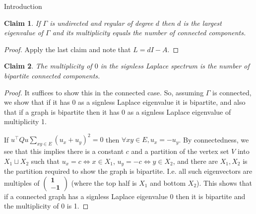 \documentclass{article}
\newtheorem{claim}{Claim}
\begin{document}
\begin{section}{Introduction}
    \begin{claim}
      If $\Gamma$ is undirected and regular of degree $d$ then $d$ is the largest eigenvalue of $\Gamma$ and its multiplicity equals the number of connected components.
    \end{claim}
    \begin{proof}
      Apply the last claim and note that $L = dI - A$.
    \end{proof}
    \begin{claim}
      The multiplicity of $0$ in the signless Laplace spectrum is the number of bipartite connected components.
    \end{claim}
    \begin{proof}
      It suffices to show this in the connected case.
      So, assuming $\Gamma$ is connected, we show that if it has 0 as a signless Laplace eigenvalue it is bipartite, and also that if a graph is bipartite then it has 0 as a signless Laplace eigenvalue of multiplicity 1.

      If $u^\intercal Q u \sum_{xy \in E}(u_x + u_y)^2 = 0$ then $\forall xy \in E, u_x = -u_y$.
      By connectedness, we see that this implies there is a constant $c$ and a partition of the vertex set $V$ into $X_1 \sqcup X_2$ such that $u_x = c \iff x \in X_1$, $u_y = -c \iff y \in X_2$, and there are $X_1, X_2$ is the partition required to show the graph is bipartite.
      I.e. all such eigenvectors are multiples of $\begin{pmatrix} \mathbf 1 \\ - \mathbf 1\end{pmatrix}$ (where the top half is $X_1$ and bottom $X_2$).
	This shows that if a connected graph has a signless Laplace eigenvalue 0 then it is bipartite and the multiplicity of $0$ is 1.


\end{proof}
\end{section}
\end{document}
